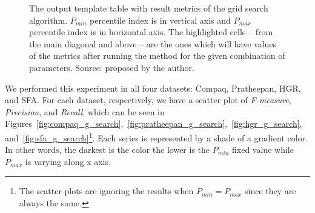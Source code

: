 \begin{figure}[ht]
    \centering

    \caption[The output template table with result metrics of the grid search algorithm]{The output template table with result metrics of the grid search algorithm. $P_{min}$ percentile index is in vertical axis and $P_{max}$ percentile index is in horizontal axis. The highlighted cells -- from the main diagonal and above -- are the ones which will have values of the metrics after running the method for the given combination of parameters. Source: proposed by the author.}
    \label{fig:gs_table_output}
\end{figure}

We performed this experiment in all four datasets: Compaq, Pratheepan, HGR, and SFA. For each dataset, respectively, we have a scatter plot of \emph{F-measure}, \emph{Precision}, and \emph{Recall}, which can be seen in Figures~\ref{fig:compaq_g_search},~\ref{fig:pratheepan_g_search},~\ref{fig:hgr_g_search}, and~\ref{fig:sfa_g_search}\footnote{The scatter plots are ignoring the results when $P_{min} = P_{max}$ since they are always the same.}. Each series is represented by a shade of a gradient color. In other words, the darkest is the color the lower is the $P_{min}$ fixed value while $P_{max}$ is varying along x axis.

